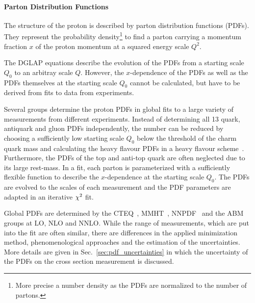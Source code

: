 \paragraph{Parton Distribution Functions}

The structure of the proton is described by parton distribution functions
(PDFs). They represent the probability density\footnote{More precise a number
density as the PDFs are normalized to the number of partons.} to find a parton
carrying a momentum fraction $x$ of the proton momentum at a squared energy
scale $Q^2$. 

The DGLAP equations describe the evolution of the PDFs from a starting scale
$Q_0$ to an arbitray scale $Q$. However, the $x$-dependence of the PDFs as well
as the PDFs themselves at the starting scale $Q_0$ cannot be calculated, but
have to be derived from fits to data from experiments.

Several groups determine the proton PDFs in global fits to a large variety of
measurements from different experiments. Instead of determining all 13 quark,
antiquark and gluon PDFs independently, the number can be reduced by choosing a
sufficiently low starting scale $Q_0$ below the threshold of the charm quark
mass and calculating the heavy flavour PDFs in a heavy flavour
scheme~\cite{Thorne:2006qt}. Furthermore, the PDFs of the top and anti-top quark
are often neglected due to its large rest-mass. In a fit, each parton is
parameterized with a sufficiently flexible function to describe the
$x$-dependence at the starting scale $Q_0$. The PDFs are evolved to the 
scales of each measurement and the PDF parameters are adapted in an iterative
$\chi^2$ fit.

Global PDFs are determined by the
CTEQ~\cite{Dulat:2015mca}, MMHT~\cite{Harland-Lang:2014zoa},
NNPDF~\cite{Ball:2014uwa} and the ABM~\cite{Alekhin:2013nda} groups at LO, NLO
and NNLO. While the range of measurements, which are put into the fit are often similar,
there are differences in the applied minimization method, phenomenological
approaches and the estimation of the uncertainties. More details are given in
Sec.~\ref{sec:pdf_uncertainties} in which the uncertainty of the PDFs on the
cross section measurement is discussed.

